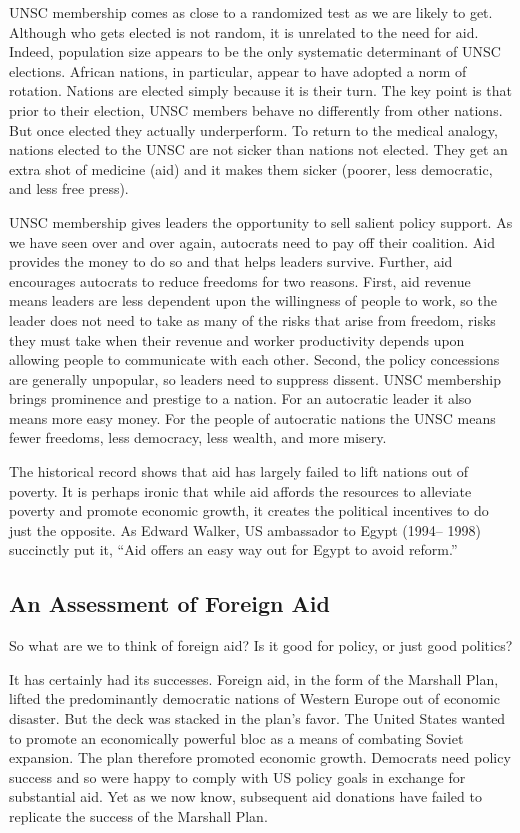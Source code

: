 \documentclass[10pt]{article}
\begin{document}
{\large UNSC membership comes as close to a randomized test as we are likely to
get. Although who gets elected is not random, it is unrelated to the need for
aid. Indeed, population size appears to be the only systematic determinant of
UNSC elections. African nations, in particular, appear to have adopted a norm of
rotation. Nations are elected simply because it is their turn. The key point is
that prior to their election, UNSC members behave no differently from other
nations. But once elected they actually underperform. To return to the medical
analogy, nations elected to the UNSC are not sicker than nations not elected.
They get an extra shot of medicine (aid) and it makes them sicker (poorer, less
democratic, and less free press).}

{\large UNSC membership gives leaders the opportunity to sell salient policy
support. As we have seen over and over again, autocrats need to pay off their
coalition. Aid provides the money to do so and that helps leaders survive.
Further, aid encourages autocrats to reduce freedoms for two reasons. First, aid
revenue means leaders are less dependent upon the willingness of people to work,
so the leader does not need to take as many of the risks that arise from freedom,
risks they must take when their revenue and worker productivity depends upon
allowing people to communicate with each other. Second, the policy concessions
are generally unpopular, so leaders need to suppress dissent. UNSC membership
brings prominence and prestige to a nation. For an autocratic leader it also
means more easy money. For the people of autocratic nations the UNSC means fewer
freedoms, less democracy, less wealth, and more misery.}

{\large The historical record shows that aid has largely failed to lift nations
out of poverty. It is perhaps ironic that while aid affords the resources to
alleviate poverty and promote economic growth, it creates the political
incentives to do just the opposite. As Edward Walker, US ambassador to Egypt
(1994-- 1998) succinctly put it, ``Aid offers an easy way out for Egypt to avoid
reform.''}

\subsection{An Assessment of Foreign Aid}

{\large So what are we to think of foreign aid? Is it good for policy, or just
good politics?}

{\large It has certainly had its successes. Foreign aid, in the form of the
Marshall Plan, lifted the predominantly democratic nations of Western Europe out
of economic disaster. But the deck was stacked in the plan's favor. The United
States wanted to promote an economically powerful bloc as a means of combating
Soviet expansion. The plan therefore promoted economic growth. Democrats need
policy success and so were happy to comply with US policy goals in exchange for
substantial aid. Yet as we now know, subsequent aid donations have failed to
replicate the success of the Marshall Plan.}
\end{document}
